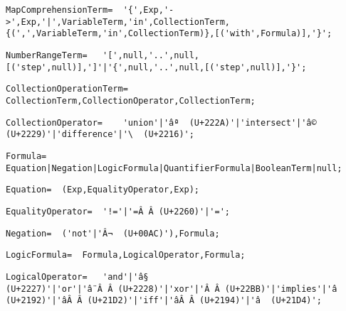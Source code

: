 \documentclass{article}
\begin{document}
    \begin{lstlisting}[mathescape=true]
     MapComprehensionTerm= 	'{',Exp,'->',Exp,'|',VariableTerm,'in',CollectionTerm,{(',',VariableTerm,'in',CollectionTerm)},[('with',Formula)],'}';
    \end{lstlisting}
    
    \begin{lstlisting}[mathescape=true]
     NumberRangeTerm= 	'[',null,'..',null,[('step',null)],']'|'{',null,'..',null,[('step',null)],'}';
    \end{lstlisting}
    
    \begin{lstlisting}[mathescape=true]
     CollectionOperationTerm= 	CollectionTerm,CollectionOperator,CollectionTerm;
    \end{lstlisting}
    
    \begin{lstlisting}[mathescape=true]
     CollectionOperator= 	'union'|'âª  (U+222A)'|'intersect'|'â©  (U+2229)'|'difference'|'\  (U+2216)';
    \end{lstlisting}
    
    \begin{lstlisting}[mathescape=true]
     Formula= 	Equation|Negation|LogicFormula|QuantifierFormula|BooleanTerm|null;
    \end{lstlisting}
    
    \begin{lstlisting}[mathescape=true]
     Equation= 	(Exp,EqualityOperator,Exp);
    \end{lstlisting}
    
    \begin{lstlisting}[mathescape=true]
     EqualityOperator= 	'!='|'=Â Â (U+2260)'|'=';
    \end{lstlisting}
    
    \begin{lstlisting}[mathescape=true]
     Negation= 	('not'|'Â¬  (U+00AC)'),Formula;
    \end{lstlisting}
    
    \begin{lstlisting}[mathescape=true]
     LogicFormula= 	Formula,LogicalOperator,Formula;
    \end{lstlisting}
    
    \begin{lstlisting}[mathescape=true]
     LogicalOperator= 	'and'|'â§  (U+2227)'|'or'|'â¨Â Â (U+2228)'|'xor'|'Â Â (U+22BB)'|'implies'|'â  (U+2192)'|'âÂ Â (U+21D2)'|'iff'|'âÂ Â (U+2194)'|'â  (U+21D4)';
    \end{lstlisting}
    
\end{document}
